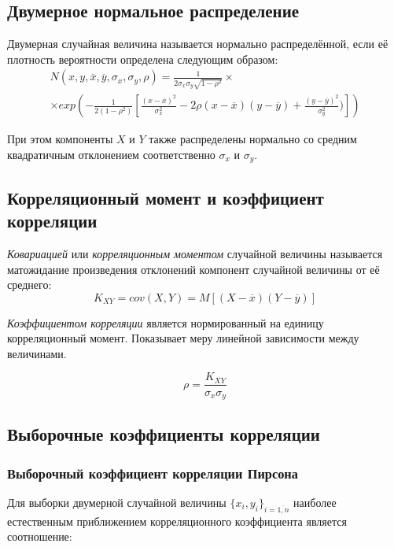 \subsection{Двумерное нормальное распределение}

Двумерная случайная величина называется нормально распределённой, если её плотность вероятности определена следующим образом:
\begin{multline}
	N(x, y, \overline{x}, \overline{y}, \sigma_x, \sigma_y, \rho) =
	\frac{1}{2 \sigma_x \sigma_y \sqrt{1 - \rho^2}} \times \\	
	\times exp \left( - \frac{1}{2(1 - \rho^2)} \left[ \frac{(x - \overline{x})^2}{\sigma_x^2} - 2 \rho (x - \overline{x}) (y - \overline{y}) + \frac{(y - \overline{y})^2}{\sigma_y^2}) \right] \right) 
\end{multline}

При этом компоненты $X$ и $Y$ также распределены нормально со средним квадратичным отклонением соответственно $\sigma_x$ и $\sigma_y$.

\subsection{Корреляционный момент и коэффициент корреляции}

\textit{Ковариацией} или \textit{корреляционным моментом} случайной величины называется матожидание произведения отклонений компонент случайной величины от её среднего:
\begin{equation}
	K_{XY} = cov(X, Y) = M[(X - \overline{x})(Y - \overline{y})]
\end{equation}

\textit{Коэффициентом корреляции} является нормированный на единицу корреляционный момент. Показывает меру линейной зависимости между величинами.

\begin{equation}\label{eq:correlation}
	\rho = \frac{K_{XY}}{\sigma_x \sigma_y}
\end{equation}

\subsection{Выборочные коэффициенты корреляции}
\subsubsection{Выборочный коэффициент корреляции Пирсона}

Для выборки двумерной случайной величины $\{x_i, y_i\}_{i=\overline{1,n}}$ наиболее естественным приближением корреляционного коэффициента является соотношение:

